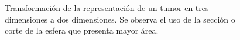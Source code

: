 \begin{figure}[!ht]
\begin{center}
\end{center}\vspace*{-0.75cm}
\caption[Transformaci\'on de la representaci\'on de un tumor en tres dimensiones a dos dimensiones]{Transformaci\'on de la representaci\'on de un tumor en tres dimensiones a dos dimensiones. Se observa el uso de la secci\'on o corte de la esfera que presenta mayor \'area.}
\label{fig-transformation}
\end{figure}


